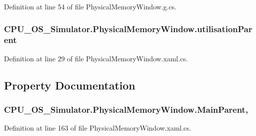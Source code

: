 Definition at line 54 of file Physical\+Memory\+Window.\+g.\+cs.

\hypertarget{class_c_p_u___o_s___simulator_1_1_physical_memory_window_a314b7959882d19b7ae5dd2a27cd38307}{}
\subsubsection[{utilisation\+Parent}]{ C\+P\+U\+\_\+\+O\+S\+\_\+\+Simulator.\+Physical\+Memory\+Window.\+utilisation\+Parent\hspace{0.3cm}{\ttfamily [private]}}\label{class_c_p_u___o_s___simulator_1_1_physical_memory_window_a314b7959882d19b7ae5dd2a27cd38307}


Definition at line 29 of file Physical\+Memory\+Window.\+xaml.\+cs.



\subsection{Property Documentation}
\hypertarget{class_c_p_u___o_s___simulator_1_1_physical_memory_window_a92c0bae7be87dec28931111c94155cf5}{}
\subsubsection[{Main\+Parent}]{ C\+P\+U\+\_\+\+O\+S\+\_\+\+Simulator.\+Physical\+Memory\+Window.\+Main\+Parent\hspace{0.3cm}{\ttfamily [get]}, {\ttfamily [set]}}\label{class_c_p_u___o_s___simulator_1_1_physical_memory_window_a92c0bae7be87dec28931111c94155cf5}


Definition at line 163 of file Physical\+Memory\+Window.\+xaml.\+cs.

